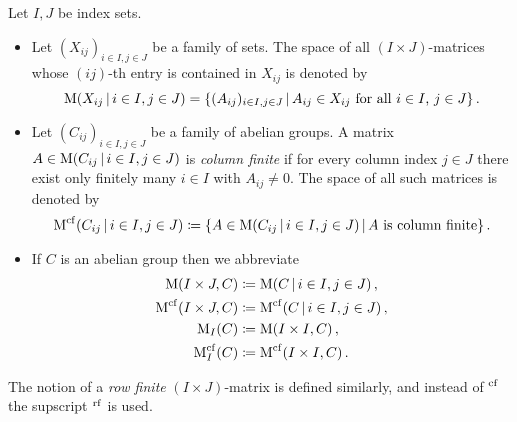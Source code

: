 \begin{definition}
  \label{definition: infinite matrices}
  Let $I, J$ be index sets.
  \begin{itemize}
    \item
      Let $(X_{ij})_{i \in I, j \in J}$ be a family of sets.
      The space of all $(I \times J)$-matrices whose $(ij)$-th entry is contained in $X_{ij}$ is denoted by
      \[
          \Mat( X_{ij} \suchthat i \in I, j \in J)
        = \{
            (A_{ij})_{i \in I, j \in J}
          \suchthat
            \text{$A_{ij} \in X_{ij}$ for all $i \in I$, $j \in J$}
          \} \,.
      \]
    \item
      Let $(C_{ij})_{i \in I, j \in J}$ be a family of abelian groups.
      A matrix $A \in \Mat( C_{ij} \suchthat i \in I, j \in J)$ is \emph{column finite} if for every column index $j \in J$ there exist only finitely many $i \in I$ with $A_{ij} \neq 0$.
      The space of all such matrices is denoted by
      \[
                  \Mat^{\cf}( C_{ij} \suchthat i \in I, j \in J )
        \defined  \left\{
                    A \in \Mat( C_{ij} \suchthat i \in I, j \in J )
                  \suchthat*
                    \text{$A$ is column finite}
                  \right\}.
      \]
    \item
      If $C$ is an abelian group then we abbreviate
      \begin{align*}
                  \Mat(I \times J, C)
        &\defined \Mat( C \suchthat i \in I, j \in J ) \,,  
        \\
                  \Mat^{\cf}(I \times J, C)
        &\defined \Mat^{\cf}( C \suchthat i \in I, j \in J ) \,,
        \\
                  \Mat_I(C)
        &\defined \Mat(I \times I, C) \,,
        \\
                  \Mat^{\cf}_I(C)
        &\defined \Mat^{\cf}(I \times I, C) \,.
      \end{align*}
  \end{itemize}
  The notion of a \emph{row finite} $(I \times J)$-matrix is defined similarly, and instead of ${}^{\operatorname{cf}}$ the supscript ${}^{\operatorname{rf}}$ is used.
\end{definition}


